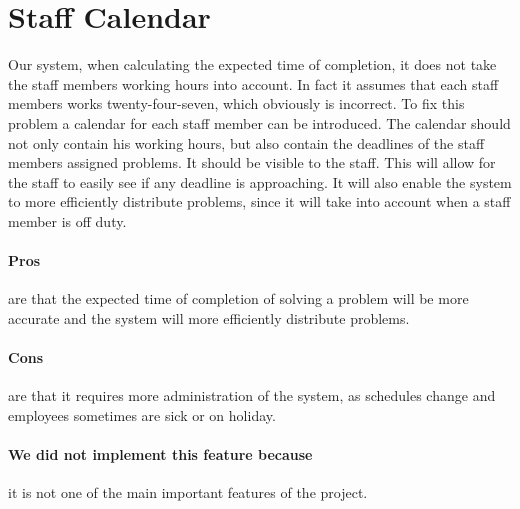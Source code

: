 \section{Staff Calendar}
\label{sec:staffCalendar}
Our system, when calculating the expected time of completion, it does not take the staff members working hours into account. 
In fact it assumes that each staff members works twenty-four-seven, which obviously is incorrect. 
To fix this problem a calendar for each staff member can be introduced. 
The calendar should not only contain his working hours, but also contain the deadlines of the staff members assigned problems. 
It should be visible to the staff. 
This will allow for the staff to easily see if any deadline is approaching. 
It will also enable the system to more efficiently distribute problems, since it will take into account when a staff member is off duty. 

\paragraph{Pros} are that the expected time of completion of solving a problem will be more accurate and the system will more efficiently distribute problems.
\paragraph{Cons} are that it requires more administration of the system, as schedules change and employees sometimes are sick or on holiday.
\paragraph{We did not implement this feature because} it is not one of the main important features of the project.